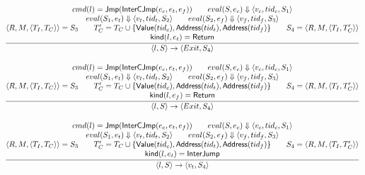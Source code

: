 \documentclass{article}
\newcommand{\step}[4]{\langle #1,#2\rangle \rightarrow \langle #3,#4\rangle}
\newcommand{\eval}[3]{eval(#1,#2) \Downarrow #3}
\begin{document}
\[
\frac{
    \begin{array}{@{}c@{}}
        cmd(l)=\mathsf{Jmp}(\mathsf{InterCJmp}(e_c,e_t,e_f)) \qquad
        \eval{S}{e_c}{\langle v_c, tid_c,S_1\rangle} \\
        
        \eval{S_1}{e_t}{\langle v_t,tid_t,S_2\rangle} \qquad
        \eval{S_2}{e_f}{\langle v_f,tid_f,S_3\rangle} \\

        \langle R,M,\langle T_I,T_C\rangle\rangle = S_3\qquad
        T_C'=T_C \cup \{ \mathsf{Value}(tid_c), \mathsf{Address}(tid_t), \mathsf{Address}(tid_f) \}\qquad
        S_4=\langle R,M,\langle T_I,T_C'\rangle\rangle\\
        
        \mathsf{kind}(l,e_t)=\mathsf{Return}
    \end{array}
} { \step{l}{S}{Exit}{S_4} }
\]

\[
\frac{
    \begin{array}{@{}c@{}}
        cmd(l)=\mathsf{Jmp}(\mathsf{InterCJmp}(e_c,e_t,e_f)) \qquad
        \eval{S}{e_c}{\langle v_c, tid_c,S_1\rangle} \\
        
        \eval{S_1}{e_t}{\langle v_t,tid_t,S_2\rangle} \qquad
        \eval{S_2}{e_f}{\langle v_f,tid_f,S_3\rangle} \\

        \langle R,M,\langle T_I,T_C\rangle\rangle = S_3\qquad
        T_C'=T_C \cup \{ \mathsf{Value}(tid_c), \mathsf{Address}(tid_t), \mathsf{Address}(tid_f) \}\qquad
        S_4=\langle R,M,\langle T_I,T_C'\rangle\rangle\\
        
        \mathsf{kind}(l,e_f)=\mathsf{Return}
    \end{array}
} { \step{l}{S}{Exit}{S_4} }
\]

\[
\frac{
    \begin{array}{@{}c@{}}
        cmd(l)=\mathsf{Jmp}(\mathsf{InterCJmp}(e_c,e_t,e_f)) \qquad
        \eval{S}{e_c}{\langle v_c, tid_c,S_1\rangle} \\
        
        \eval{S_1}{e_t}{\langle v_t,tid_t,S_2\rangle} \qquad
        \eval{S_2}{e_f}{\langle v_f,tid_f,S_3\rangle} \\

        \langle R,M,\langle T_I,T_C\rangle\rangle = S_3\qquad
        T_C'=T_C \cup \{ \mathsf{Value}(tid_c), \mathsf{Address}(tid_t), \mathsf{Address}(tid_f) \}\qquad
        S_4=\langle R,M,\langle T_I,T_C'\rangle\rangle\\
        
        \mathsf{kind}(l,e_t)=\mathsf{InterJump}
    \end{array}
} { \step{l}{S}{v_t}{S_4} }
\]
\end{document}
